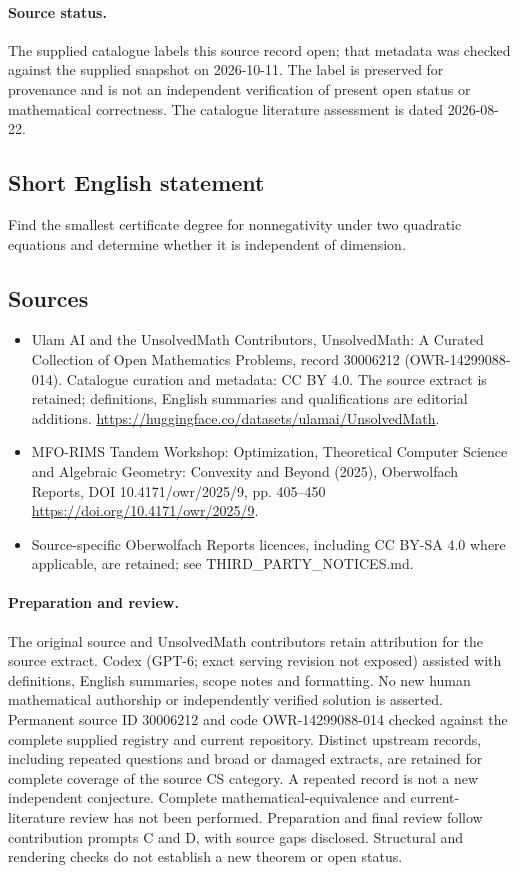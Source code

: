 \documentclass[11pt]{article}
\begin{document}
\paragraph{Source status.}
The supplied catalogue labels this source record open; that metadata was checked against the supplied snapshot on 2026-10-11. The label is preserved for provenance and is not an independent verification of present open status or mathematical correctness. The catalogue literature assessment is dated 2026-08-22.
\subsection{Short English statement}
Find the smallest certificate degree for nonnegativity under two quadratic equations and determine whether it is independent of dimension.
\subsection{Sources}
\begin{itemize}
\item[\hypertarget{source:30006212:1}{S1}] Ulam AI and the UnsolvedMath Contributors, UnsolvedMath: A Curated Collection of Open Mathematics Problems, record 30006212 (OWR-14299088-014). Catalogue curation and metadata: CC BY 4.0. The source extract is retained; definitions, English summaries and qualifications are editorial additions.
\url{https://huggingface.co/datasets/ulamai/UnsolvedMath}.
\item[\hypertarget{source:30006212:2}{S2}] MFO-RIMS Tandem Workshop: Optimization, Theoretical Computer Science and Algebraic Geometry: Convexity and Beyond (2025), Oberwolfach Reports, DOI 10.4171/owr/2025/9, pp. 405--450
\url{https://doi.org/10.4171/owr/2025/9}.
\item Source-specific Oberwolfach Reports licences, including CC BY-SA 4.0 where applicable, are retained; see THIRD\_PARTY\_NOTICES.md.
\end{itemize}
\paragraph{Preparation and review.}
The original source and UnsolvedMath contributors retain attribution for the source extract. Codex (GPT-6; exact serving revision not exposed) assisted with definitions, English summaries, scope notes and formatting. No new human mathematical authorship or independently verified solution is asserted. Permanent source ID 30006212 and code OWR-14299088-014 checked against the complete supplied registry and current repository. Distinct upstream records, including repeated questions and broad or damaged extracts, are retained for complete coverage of the source CS category. A repeated record is not a new independent conjecture. Complete mathematical-equivalence and current-literature review has not been performed. Preparation and final review follow contribution prompts C and D, with source gaps disclosed. Structural and rendering checks do not establish a new theorem or open status.
\label{end:30006212}
\end{document}
